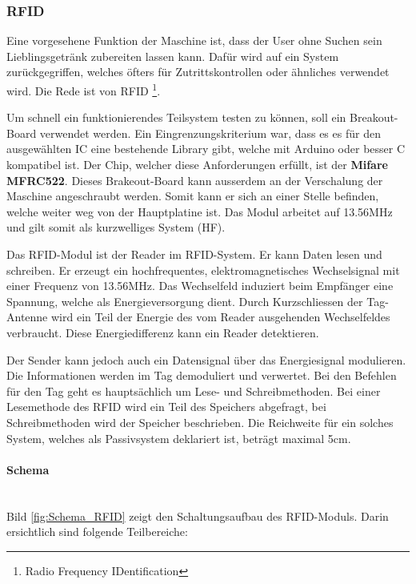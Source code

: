 \subsubsection{RFID}
\label{subsubsec:RFID}

Eine vorgesehene Funktion der Maschine ist, dass der User ohne Suchen sein Lieblingsgetränk zubereiten lassen kann. Dafür wird auf ein System zurückgegriffen, welches öfters für Zutrittskontrollen oder ähnliches verwendet wird. Die Rede ist von RFID \footnote{Radio Frequency IDentification}.

Um schnell ein funktionierendes Teilsystem testen zu können, soll ein Breakout-Board verwendet werden. Ein Eingrenzungskriterium war, dass es es für den ausgewählten IC eine bestehende Library gibt, welche mit Arduino oder besser C kompatibel ist. Der Chip, welcher diese Anforderungen erfüllt, ist der \textbf{Mifare MFRC522}. Dieses Brakeout-Board kann ausserdem an der Verschalung der Maschine angeschraubt werden. Somit kann er sich an einer Stelle befinden, welche weiter weg von der Hauptplatine ist.
Das Modul arbeitet auf 13.56MHz und gilt somit als kurzwelliges System (HF). \cite{nxp_semiconductors_nv_mfrc522_2017}

Das RFID-Modul ist der Reader im RFID-System. Er kann Daten lesen und schreiben. Er erzeugt ein hochfrequentes, elektromagnetisches Wechselsignal mit einer Frequenz von 13.56MHz. Das Wechselfeld induziert beim Empfänger eine Spannung, welche als Energieversorgung dient. Durch Kurzschliessen der Tag-Antenne wird ein Teil der Energie des vom Reader ausgehenden Wechselfeldes verbraucht. Diese Energiedifferenz kann ein Reader detektieren.

Der Sender kann jedoch auch ein Datensignal über das Energiesignal modulieren. Die Informationen werden im Tag demoduliert und verwertet. Bei den Befehlen für den Tag geht es hauptsächlich um Lese- und Schreibmethoden. Bei einer Lesemethode des RFID wird ein Teil des Speichers abgefragt, bei Schreibmethoden wird der Speicher beschrieben. Die Reichweite für ein solches System, welches als Passivsystem deklariert ist, beträgt maximal 5cm. \cite{rfid-basisde_aufbau_2018}

\paragraph{Schema}\mbox{}\\

Bild \ref{fig:Schema_RFID} zeigt den Schaltungsaufbau des RFID-Moduls. Darin ersichtlich sind folgende Teilbereiche:

